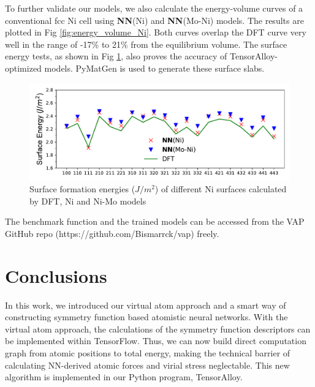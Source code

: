 \documentclass[preprint]{revtex4-2}
\begin{document}
To further validate our models, we also calculate the energy-volume curves of a 
conventional fcc Ni cell using \textbf{NN}(Ni) and \textbf{NN}(Mo-Ni) models. 
The results are plotted in Fig \ref{fig:energy_volume_Ni}. Both curves overlap 
the DFT curve very well in the range of -17\% to 21\% from the equilibrium 
volume. The surface energy tests, as shown in Fig \ref{fig:surface_energy_Ni}, 
also proves the accuracy of TensorAlloy-optimized models. 
PyMatGen\cite{pymatgen,pymatgen-1} is used to generate these surface slabs.

% 
%
\begin{figure}[h!]
    \centering
    \includegraphics[scale=0.8]{figures/Ni_surface_energy.pdf}
\caption{\label{fig:surface_energy_Ni} Surface formation energies ($J/m^2$) of 
different Ni surfaces calculated by DFT, Ni and Ni-Mo models}
\end{figure}

The benchmark function and the trained models can be accessed from the VAP 
GitHub repo (https://github.com/Bismarrck/vap) freely.

% 
%
\section{Conclusions}
\label{section:conclusions}

In this work, we introduced our virtual atom approach and a smart way of 
constructing symmetry function based atomistic neural networks. 
With the virtual atom approach, the calculations of the symmetry function 
descriptors can be implemented within TensorFlow. Thus, we can now build direct 
computation graph from atomic positions to total energy, making the technical 
barrier of calculating NN-derived atomic forces and virial stress neglectable.
This new algorithm is implemented in our Python program, TensorAlloy.
\end{document}
